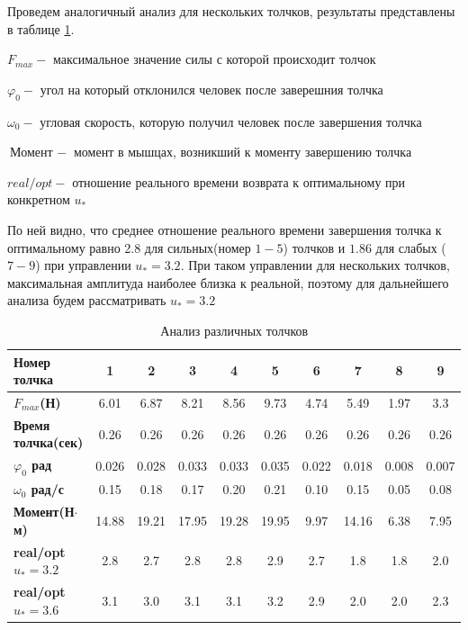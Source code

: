 \documentclass[a4paper,12pt, openany]{book}
\theoremstyle{plain} %
\theoremstyle{definition} %
\theoremstyle{remark} %
\numberwithin{equation}{chapter}
\begin{document}
{Проведем аналогичный анализ для нескольких толчков,
результаты представлены в таблице \ref{final_table}.

$F_{max} - $ максимальное значение силы с которой происходит толчок

$\varphi_0 - $ угол на который отклонился человек после заверешния толчка

$\omega_0 - $ угловая скорость, которую получил человек после завершения толчка

$\text{Момент } - $ момент в мышцах, возникший к моменту завершению толчка

$real/opt - $ отношение реального времени возврата к оптимальному при конкретном $u_\ast$

По ней видно, что среднее отношение реального времени завершения толчка к оптимальному равно 2.8 для сильных(номер $1-5$)
толчков и $1.86$ для слабых ($7-9$) при управлении $u_*=3.2$.
При таком управлении для нескольких толчков, максимальная амплитуда наиболее близка к реальной, поэтому для дальнейшего анализа будем рассматривать $u_*=3.2$

\begin{table}[h!]
    \centering
    \begin{tabular}{|l|c|c|c|c|c|c|c|c|c|}
        \hline
        \textbf{Номер толчка}       & \textbf{1} & \textbf{2} & \textbf{3} & \textbf{4} & \textbf{5} & \textbf{6} & \textbf{7} & \textbf{8} & \textbf{9} \\ \hline
        \textbf{$F_{max}$(Н)}       & 6.01       & 6.87       & 8.21       & 8.56       & 9.73       & 4.74       & 5.49       & 1.97       & 3.3        \\ \hline
        \textbf{Время толчка(сек)}  & 0.26       & 0.26       & 0.26       & 0.26       & 0.26       & 0.26       & 0.26       & 0.26       & 0.26       \\ \hline
        \textbf{$\varphi_0$ рад}        & 0.026      & 0.028      & 0.033      & 0.033      & 0.035      & 0.022      & 0.018      & 0.008      & 0.007      \\ \hline
        \textbf{$\omega_0$ рад/с}         & 0.15     & 0.18     & 0.17     & 0.20     & 0.21     & 0.10     & 0.15     & 0.05     & 0.08     \\ \hline
        \textbf{Момент(Н$\cdot$м)}       & 14.88      & 19.21      & 17.95      & 19.28      & 19.95      & 9.97       & 14.16      & 6.38       & 7.95       \\ \hline
        \textbf{real/opt $u_*=3.2$} & 2.8        & 2.7        & 2.8        & 2.8        & 2.9        & 2.7        & 1.8        & 1.8        & 2.0        \\ \hline
        \textbf{real/opt $u_*=3.6$} & 3.1        & 3.0        & 3.1        & 3.1        & 3.2        & 2.9        & 2.0        & 2.0        & 2.3        \\ \hline
    \end{tabular}
    \caption{Анализ различных толчков}
    \label{final_table}
\end{table}
\newpage
}
\end{document}
